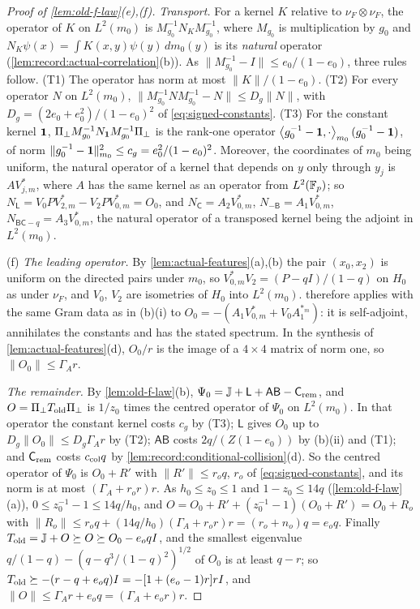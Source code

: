 \begin{proof}[Proof of \cref{lem:old-f-law}(e),(f)]
\emph{Transport.} For a kernel $K$ relative to $\nu_F\otimes\nu_F$, the operator
of $K$ on $L^2(m_0)$ is $M_{g_0}^{-1}N_KM_{g_0}^{-1}$, where $M_{g_0}$ is
multiplication by $g_0$ and $N_K\psi(x)=\int K(x,y)\psi(y)\,dm_0(y)$ is its
\emph{natural} operator (\cref{lem:record:actual-correlation}(b)). As
$\|M_{g_0}^{-1}-I\|\le e_0/(1-e_0)$, three rules follow. (T1) The operator has norm
at most $\|K\|/(1-e_0)$. (T2) For every operator $N$ on $L^2(m_0)$,
$\|M_{g_0}^{-1}NM_{g_0}^{-1}-N\|\le D_g\|N\|$, with $D_g=(2e_0+e_0^2)/(1-e_0)^2$ of
\eqref{eq:signed-constants}. (T3) For the constant kernel $\mathbf 1$,
$\Pi_\perp M_{g_0}^{-1}N_{\mathbf 1}M_{g_0}^{-1}\Pi_\perp$ is the rank-one operator
$\left\langle g_0^{-1}-\mathbf 1,\cdot\right\rangle_{m_0}(g_0^{-1}-\mathbf 1)$, of norm
$\|g_0^{-1}-\mathbf 1\|^2_{m_0}\le c_g=e_0^2/(1-e_0)^2$. Moreover, the coordinates of
$m_0$ being uniform, the natural operator of a kernel that depends on $y$ only
through $y_j$ is $AV^*_{j,m}$, where $A$ has the same kernel as an operator from
$L^2(\mathbb F_p)$; so $N_{\mathsf L}=V_0PV^*_{2,m}-V_2PV^*_{0,m}=O_0$, and
$N_{\mathsf C}=A_2V^*_{0,m}$, $N_{-\mathsf B}=A_1V^*_{0,m}$,
$N_{\mathsf B\mathsf C-q}=A_3V^*_{0,m}$, the natural operator of a transposed kernel
being the adjoint in $L^2(m_0)$.

(f) \emph{The leading operator.} By \cref{lem:actual-features}(a),(b) the pair
$(x_0,x_2)$ is uniform on the directed pairs under $m_0$, so
$V^*_{0,m}V_2=(P-qI)/(1-q)$ on $H_0$ as under $\nu_F$, and $V_0$, $V_2$ are
isometries of $H_0$ into $L^2(m_0)$.  therefore
applies with the same Gram data as in (b)(i) to
$O_0=-(A_1V^*_{0,m}+V_0A_1^{*_m})$: it is self-adjoint,
annihilates the constants and has the stated spectrum. In the synthesis of
\cref{lem:actual-features}(d), $O_0/r$ is the image of a $4\times4$ matrix of
norm one, so $\|O_0\|\le\Gamma_Ar$.

\emph{The remainder.} By \cref{lem:old-f-law}(b),
$\Psi_0=\mathbb J+\mathsf L+\mathsf A\mathsf B-\mathsf C_{\rm rem}$, and
$O=\Pi_\perp T_{\rm old}\Pi_\perp$ is $1/z_0$ times the centred operator of
$\Psi_0$ on $L^2(m_0)$. In that operator the constant kernel costs $c_g$ by
(T3); $\mathsf L$ gives $O_0$ up to $D_g\|O_0\|\le D_g\Gamma_Ar$ by (T2);
$\mathsf A\mathsf B$ costs $2q/(Z(1-e_0))$ by (b)(ii) and (T1); and
$\mathsf C_{\rm rem}$ costs $c_{\rm col}q$ by
\cref{lem:record:conditional-collision}(d). So the centred operator of
$\Psi_0$ is $O_0+R'$ with $\|R'\|\le r_oq$, $r_o$ of \eqref{eq:signed-constants},
and its norm is at most $(\Gamma_A+r_or)r$. As $h_0\le z_0\le1$ and
$1-z_0\le14q$ (\cref{lem:old-f-law}(a)), $0\le z_0^{-1}-1\le14q/h_0$, and
$O=O_0+R'+(z_0^{-1}-1)(O_0+R')=O_0+R_o$ with
$\|R_o\|\le r_oq+(14q/h_0)(\Gamma_A+r_or)r=(r_o+n_o)q=e_oq$. Finally
$T_{\rm old}=\mathbb J+O\succeq O\succeq O_0-e_oqI$, and the smallest eigenvalue
$q/(1-q)-(q-q^3/(1-q)^2)^{1/2}$ of $O_0$ is at least $q-r$; so
$T_{\rm old}\succeq-(r-q+e_oq)I=-[1+(e_o-1)r]rI$, and
$\|O\|\le\Gamma_Ar+e_oq=(\Gamma_A+e_or)r$.


\end{proof}
